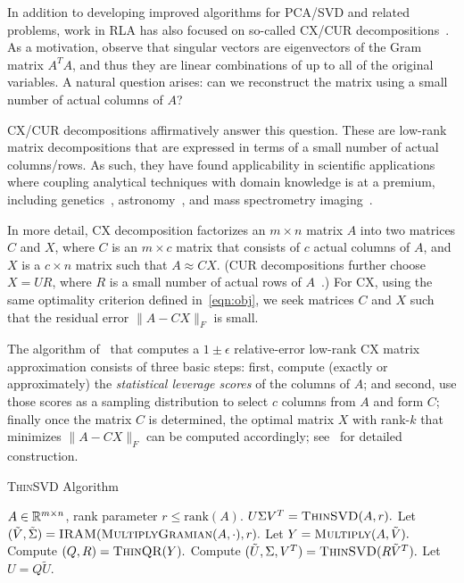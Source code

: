 In addition to developing improved algorithms for PCA/SVD and related problems,
work in RLA has also focused on so-called CX/CUR
decompositions~\cite{DMM08,CUR_PNAS}.  As a motivation, observe that singular
vectors are eigenvectors of the Gram matrix $A^TA$, and thus they are linear
combinations of up to all of the original variables.  A natural question
arises: can we reconstruct the matrix using a small number of actual columns of
$A$?

CX/CUR decompositions affirmatively answer this question. These are
low-rank matrix decompositions that are expressed in terms of a small number of
actual columns/rows. As such, they have found applicability in scientific
applications where coupling analytical techniques with domain knowledge is at a
premium, including genetics~\cite{Paschou07b}, astronomy~\cite{Yip14-AJ}, and
mass spectrometry imaging~\cite{YRPMB15}.

In more detail, CX decomposition factorizes an $m \times n$ matrix $A$ into two
matrices $C$ and $X$, where $C$ is an $m\times c$ matrix that consists of $c$
actual columns of $A$, and $X$ is a $c \times n$ matrix such that $A\approx
CX$.  (CUR decompositions further choose $X=UR$, where $R$ is a small number of
actual rows of $A$~\cite{DMM08,CUR_PNAS}.) For CX, using the same optimality
criterion defined in~\eqref{eqn:obj}, we seek matrices $C$ and $X$ such that
the residual error $\|A-CX\|_F$ is small.

The algorithm of~\cite{DMM08} that computes a $1\pm\epsilon$ relative-error
low-rank CX matrix approximation consists of three basic steps: first, compute
(exactly or approximately) the {\it statistical leverage scores} of the columns
of $A$; and second, use those scores as a sampling distribution to select $c$
columns from $A$ and form $C$; finally once the matrix $C$ is determined, the
optimal matrix $X$ with rank-$k$ that minimizes $\|A-CX\|_F$ can be computed
accordingly; see~\cite{DMM08} for detailed construction. 

\begin{algorithm}[tb]
  \caption{\textsc{ThinSVD} Algorithm}
  \label{alg:thinSVD}
  \begin{algorithmic}[1]
    \Require $A \in \mathbb{R}^{m\times n}$, rank parameter $r \leq \textrm{rank}(A).$
    \Ensure $U \Sigma V^T = \textsc{ThinSVD}(A, r).$
    \State Let $(\tilde{V}, \tilde{\Sigma}) = \textsc{IRAM}(\textsc{MultiplyGramian}(A, \cdot), r).$
    \State Let $Y = \textsc{Multiply}(A, \tilde{V}).$
    \State Compute $(Q, R) = \textsc{ThinQR}(Y).$
    \State Compute $(\tilde{U}, \Sigma, V^T) = \textsc{ThinSVD}(R \tilde{V}^T).$
    \State Let $U = Q \tilde{U}.$  
  \end{algorithmic}
\end{algorithm}

